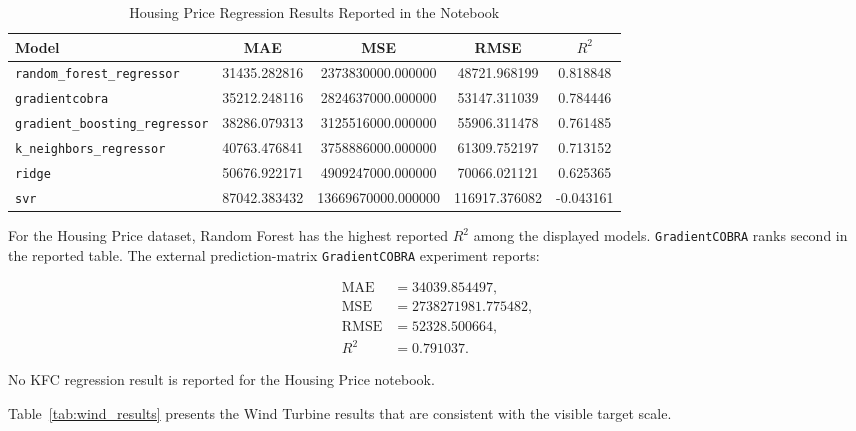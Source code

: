 \begin{table}[H]
    \centering
    \caption{Housing Price Regression Results Reported in the Notebook}
    \label{tab:housing_results}
    \small
    \begin{tabular}{l c c c c}
        \hline
        \textbf{Model}                       & \textbf{MAE} & \textbf{MSE}       & \textbf{RMSE} & \textbf{$R^2$} \\
        \hline
        \texttt{random\_forest\_regressor}     & 31435.282816 & 2373830000.000000  & 48721.968199  & 0.818848 \\
        \texttt{gradientcobra}               & 35212.248116 & 2824637000.000000  & 53147.311039  & 0.784446 \\
        \texttt{gradient\_boosting\_regressor} & 38286.079313 & 3125516000.000000  & 55906.311478  & 0.761485 \\
        \texttt{k\_neighbors\_regressor}       & 40763.476841 & 3758886000.000000  & 61309.752197  & 0.713152 \\
        \texttt{ridge}                       & 50676.922171 & 4909247000.000000  & 70066.021121  & 0.625365 \\
        \texttt{svr}                         & 87042.383432 & 13669670000.000000 & 116917.376082 & -0.043161 \\
        \hline
    \end{tabular}
\end{table}

For the Housing Price dataset, Random Forest has the highest reported $R^2$ among the displayed models. \texttt{GradientCOBRA} ranks second in the reported table. The external prediction-matrix \texttt{GradientCOBRA} experiment reports:

\[
\begin{aligned}
\text{MAE} &= 34039.854497, \\
\text{MSE} &= 2738271981.775482, \\
\text{RMSE} &= 52328.500664, \\
R^2 &= 0.791037.
\end{aligned}
\]

No KFC regression result is reported for the Housing Price notebook.

Table~\ref{tab:wind_results} presents the Wind Turbine results that are consistent with the visible target scale.


